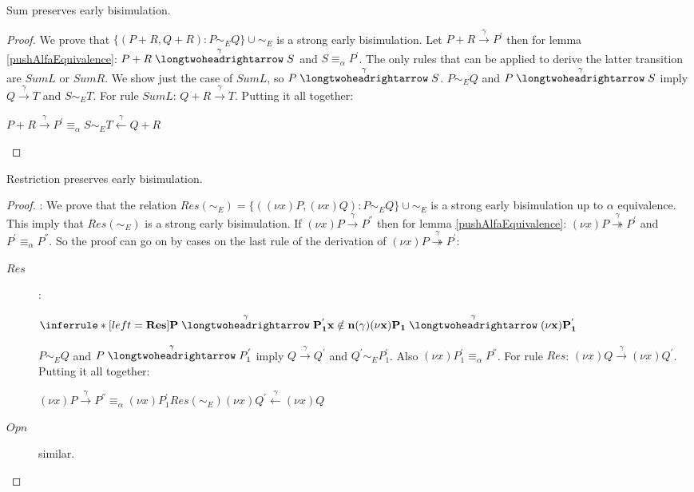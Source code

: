 \begin{lemma}\label{sumPreservesEarlyBisimulation}
  Sum preserves early bisimulation. 
  \begin{proof}
    We prove that $\{(P+R, Q+R): P\sim_{E}Q\}\cup \sim_{E}$ is a strong early bisimulation. Let $P+R\xrightarrow{\gamma}P^{'}$ then for lemma \ref{pushAlfaEquivalence}: $P+R\stackrel{\gamma}{\longtwoheadrightarrow} S$ and $S\equiv_{\alpha}P^{'}$. The only rules that can be applied to derive the latter transition are $SumL$ or $SumR$. We show just the case of $SumL$, so $P\stackrel{\gamma}{\longtwoheadrightarrow} S$. $P\sim_{E} Q$ and $P\stackrel{\gamma}{\longtwoheadrightarrow} S$ imply $Q\xrightarrow{\gamma} T$ and $S\sim_{E} T$. For rule $SumL$: $Q+R\xrightarrow{\gamma} T$. Putting it all together:
    \begin{center}
      $P+R\xrightarrow{\gamma}P^{'} \equiv_{\alpha} S \sim_{E} T \stackrel{\gamma}{\longleftarrow} Q+R$
    \end{center}
  \end{proof}
\end{lemma}

\begin{lemma}\label{restrictionPreservesEarlyBisimulation}
  Restriction preserves early bisimulation.
  \begin{proof}:
      We prove that the relation $Res(\sim_{E})=\{((\nu x)P, (\nu x)Q): P\sim_{E} Q\} \cup \sim_{E}$ is a strong early bisimulation up to $\alpha$ equivalence. This imply that $Res(\sim_{E})$ is a strong early bisimulation. If $(\nu x)P\xrightarrow{\gamma}P^{''}$ then for lemma \ref{pushAlfaEquivalence}: $(\nu x)P\stackrel{\gamma}{\twoheadrightarrow}P^{'}$ and $P^{'}\equiv_{\alpha}P^{''}$. So the proof can go on by cases on the last rule of the derivation of $(\nu x)P\stackrel{\gamma}{\twoheadrightarrow} P^{'}$:
	\begin{description}
 	  \item[$Res$]:
   	    \begin{center}
   	      $\inferrule* [left=\bf{Res}]{
		    P \stackrel{\gamma}{\longtwoheadrightarrow} P_{1}^{'}
		  \\
		    x \notin n(\gamma)
		  }{
		    (\nu x)P_{1} \stackrel{\gamma}{\longtwoheadrightarrow} (\nu x)P_{1}^{'}
	      }$
   	    \end{center}
 	    $P\sim_{E}Q$ and $P \stackrel{\gamma}{\longtwoheadrightarrow} P_{1}^{'}$ imply $Q \xrightarrow{\gamma} Q^{'}$ and $Q^{'} \sim_{E} P_{1}^{'}$. Also $(\nu x)P_{1}^{'} \equiv_{\alpha} P^{''}$. For rule $Res$: $(\nu x)Q \xrightarrow{\gamma} (\nu x)Q^{'}$. Putting it all together:
 	    \begin{center}
 	      $(\nu x)P \xrightarrow{\gamma} P^{''} \equiv_{\alpha} (\nu x)P_{1}^{'}  Res(\sim_{E}) (\nu x)Q^{'} \stackrel{\gamma}{\leftarrow} (\nu x)Q$
 	    \end{center}
  	  \item[$Opn$] similar.
	\end{description}
  \end{proof}
\end{lemma}


